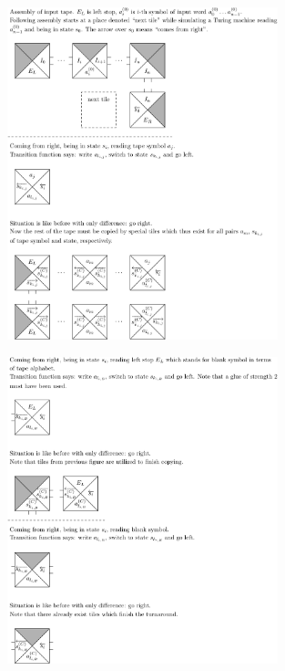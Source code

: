 \documentclass[10pt]{beamer}
\theoremstyle{definition}
\theoremstyle{remark}
\begin{document}
\begin{frame}[plain]
	\begin{figure}[h]
	\begin{center}
		\includegraphics[width=0.7\textwidth]{../figures/turing_tiles/out1-1.pdf} %
	\end{center}
	\end{figure}
\end{frame}

\begin{frame}[plain]
	\begin{figure}[h]
	\begin{center}
		\includegraphics[width=0.7\textwidth]{../figures/turing_tiles/out2-1.pdf} %
	\end{center}
	\end{figure}
\end{frame}
\end{document}
